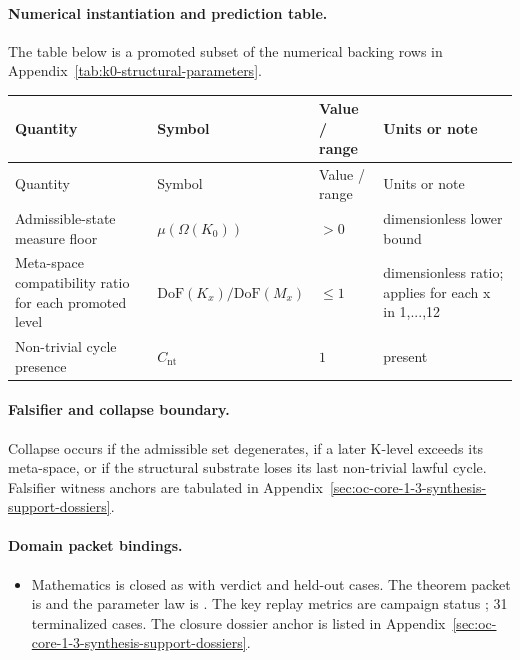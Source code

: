 \paragraph{Numerical instantiation and prediction table.}
The table below is a promoted subset of the numerical backing rows in Appendix~\ref{tab:k0-structural-parameters}.
\begin{longtable}{@{}L{0.27\textwidth}L{0.15\textwidth}L{0.24\textwidth}L{0.16\textwidth}@{}}
\toprule
Quantity & Symbol & Value / range & Units or note \\
\midrule
\endfirsthead
\toprule
Quantity & Symbol & Value / range & Units or note \\
\midrule
\endhead
Admissible-state measure floor & $\scriptstyle \mu(\Omega(K_0))$ & $> 0$ & dimensionless lower bound \\
Meta-space compatibility ratio for each promoted level & $\scriptstyle \mathrm{DoF}(K_x)/\allowbreak \mathrm{DoF}(M_x)$ & $\leq 1$ & dimensionless ratio; applies for each x in 1,...,12 \\
Non-trivial cycle presence & $\scriptstyle C_{\mathrm{nt}}$ & $1$ & present \\
\bottomrule
\end{longtable}

\paragraph{Falsifier and collapse boundary.}
Collapse occurs if the admissible set degenerates, if a later K-level exceeds its meta-space, or if the structural substrate loses its last non-trivial lawful cycle.
Falsifier witness anchors are tabulated in Appendix~\ref{sec:oc-core-1-3-synthesis-support-dossiers}.

\paragraph{Domain packet bindings.}
\begin{itemize}[leftmargin=1.6em,nosep]
\item Mathematics is closed as  with verdict  and  held-out cases. The theorem packet is  and the parameter law is . The key replay metrics are campaign status ; 31 terminalized cases. The closure dossier anchor is listed in Appendix~\ref{sec:oc-core-1-3-synthesis-support-dossiers}.
\end{itemize}

